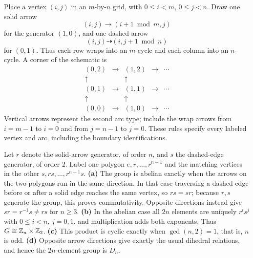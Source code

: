 Place a vertex $(i,j)$ in an $m$-by-$n$ grid, with $0\le i<m$, $0\le j<n$. Draw one solid arrow
\[(i,j)\longrightarrow(i+1\bmod m,j)\]
for the generator $(1,0)$, and one dashed arrow
\[(i,j)\dashrightarrow(i,j+1\bmod n)\]
for $(0,1)$. Thus each row wraps into an $m$-cycle and each column into an $n$-cycle. A corner of the schematic is
\[\begin{array}{ccccc}
(0,2)&\longrightarrow&(1,2)&\longrightarrow&\cdots\\
\uparrow&&\uparrow&&\\
(0,1)&\longrightarrow&(1,1)&\longrightarrow&\cdots\\
\uparrow&&\uparrow&&\\
(0,0)&\longrightarrow&(1,0)&\longrightarrow&\cdots
\end{array}\]
Vertical arrows represent the second arc type; include the wrap arrows from $i=m-1$ to $i=0$ and from $j=n-1$ to $j=0$. These rules specify every labeled vertex and arc, including the boundary identifications.

Let $r$ denote the solid-arrow generator, of order $n$, and $s$ the dashed-edge generator, of order $2$. Label one polygon $e,r,\ldots,r^{n-1}$ and the matching vertices in the other $s,rs,\ldots,r^{n-1}s$.
\textbf{(a)} The group is abelian exactly when the arrows on the two polygons run in the same direction. In that case traversing a dashed edge before or after a solid edge reaches the same vertex, so $rs=sr$; because $r,s$ generate the group, this proves commutativity. Opposite directions instead give $sr=r^{-1}s\ne rs$ for $n\ge3$.
\textbf{(b)} In the abelian case all $2n$ elements are uniquely $r^is^j$ with $0\le i<n$, $j=0,1$, and multiplication adds both exponents. Thus $G\cong\mathbb{Z}_n\times\mathbb{Z}_2$.
\textbf{(c)} This product is cyclic exactly when $\gcd(n,2)=1$, that is, $n$ is odd.
\textbf{(d)} Opposite arrow directions give exactly the usual dihedral relations, and hence the $2n$-element group is $D_n$.

